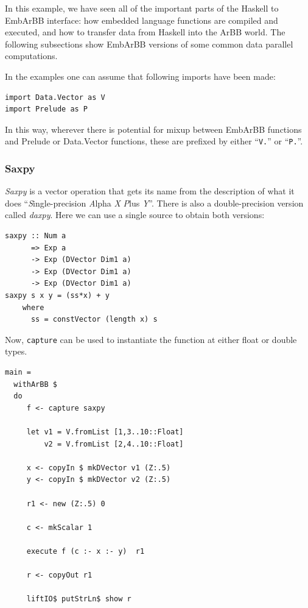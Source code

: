 In this example, we have seen all of the important parts of the
Haskell to EmbArBB interface: how embedded language functions are compiled and
executed, and how to transfer data from Haskell into the ArBB world.
The following subsections show EmbArBB versions of some common 
data parallel computations.



In the examples one can assume that following imports have been made: 
\begin{verbatim}
import Data.Vector as V
import Prelude as P
\end{verbatim}
In this way, wherever there is potential for mixup between EmbArBB functions 
and Prelude or Data.Vector functions, these are prefixed by either ``{\tt V.}'' or 
``{\tt P.}''. 

\subsubsection{Saxpy} 
{\em Saxpy} is a vector operation that gets its name from the 
description of what it does ``{\em S}ingle-precision {\em A}lpha {\em X} {\em P}lus {\em Y}''. 
There is also a double-precision version called {\em daxpy}. Here we can use a single source 
to obtain both versions:

\begin{verbatim} 
saxpy :: Num a 
      => Exp a 
      -> Exp (DVector Dim1 a) 
      -> Exp (DVector Dim1 a) 
      -> Exp (DVector Dim1 a) 
saxpy s x y = (ss*x) + y 
    where 
      ss = constVector (length x) s
\end{verbatim}

Now, {\tt capture} can be used to instantiate the function at either float or double 
types.  

\begin{verbatim}
main = 
  withArBB $ 
  do 
     f <- capture saxpy
     
     let v1 = V.fromList [1,3..10::Float] 
         v2 = V.fromList [2,4..10::Float] 
          
     x <- copyIn $ mkDVector v1 (Z:.5) 
     y <- copyIn $ mkDVector v2 (Z:.5) 
     
     r1 <- new (Z:.5) 0    
           
     c <- mkScalar 1 
     
     execute f (c :- x :- y)  r1
              
     r <- copyOut r1
              
     liftIO$ putStrLn$ show r
\end{verbatim}

